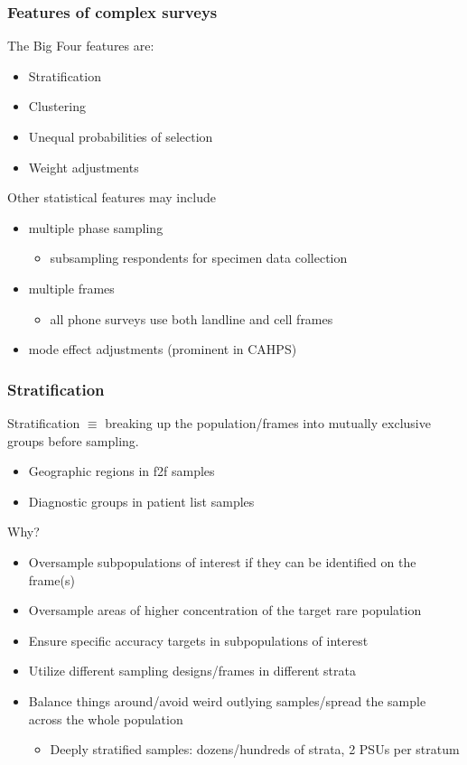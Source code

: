 \documentclass[handout]{beamer}
\begin{document}
\begin{frame}\frametitle{Features of complex surveys}

The Big Four features are:

\begin{itemize}
    \item Stratification
    \item Clustering
    \item Unequal probabilities of selection
    \item Weight adjustments
\end{itemize}

Other statistical features may include
\begin{itemize}
    \item multiple phase sampling
        \begin{itemize} \item subsampling respondents for specimen data collection \end{itemize}
    \item multiple frames
        \begin{itemize} \item all phone surveys use both landline and cell frames \end{itemize}
    \item mode effect adjustments (prominent in CAHPS)
\end{itemize}

\end{frame}

\begin{frame}\frametitle{Stratification}

Stratification $\equiv$ breaking up the population/frames into mutually exclusive groups before sampling.
\begin{itemize}
    \item Geographic regions in f2f samples
    \item Diagnostic groups in patient list samples
\end{itemize}

Why?

\begin{itemize}
    \item Oversample subpopulations of interest if they can be identified on the frame(s)
    \item Oversample areas of higher concentration of the target rare population
    \item Ensure specific accuracy targets in subpopulations of interest
    \item Utilize different sampling designs/frames in different strata
    \item Balance things around/avoid weird outlying samples/spread the sample across the whole population
    \begin{itemize} \item Deeply stratified samples: dozens/hundreds of strata, 2 PSUs per stratum \end{itemize}
\end{itemize}



\end{frame}
\end{document}
